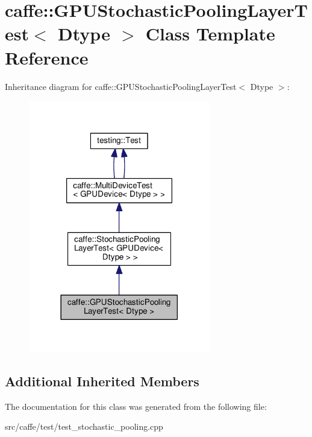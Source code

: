 \hypertarget{classcaffe_1_1_g_p_u_stochastic_pooling_layer_test}{}\section{caffe\+:\+:G\+P\+U\+Stochastic\+Pooling\+Layer\+Test$<$ Dtype $>$ Class Template Reference}
\label{classcaffe_1_1_g_p_u_stochastic_pooling_layer_test}


Inheritance diagram for caffe\+:\+:G\+P\+U\+Stochastic\+Pooling\+Layer\+Test$<$ Dtype $>$\+:
\nopagebreak
\begin{figure}[H]
\begin{center}
\leavevmode
\includegraphics[width=225pt]{classcaffe_1_1_g_p_u_stochastic_pooling_layer_test__inherit__graph}
\end{center}
\end{figure}
\subsection*{Additional Inherited Members}


The documentation for this class was generated from the following file\+:\begin{DoxyCompactItemize}
\item 
src/caffe/test/test\+\_\+stochastic\+\_\+pooling.\+cpp\end{DoxyCompactItemize}
